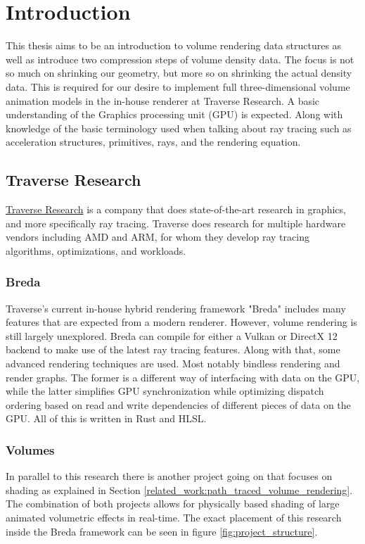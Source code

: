 \section{Introduction} \label{introduction}
This thesis aims to be an introduction to volume rendering data structures as well as introduce two compression steps of volume density data. The focus is not so much on shrinking our geometry, but more so on shrinking the actual density data. This is required for our desire to implement full three-dimensional volume animation models in the in-house renderer at Traverse Research. A basic understanding of the Graphics processing unit (GPU) is expected. Along with knowledge of the basic terminology used when talking about ray tracing such as acceleration structures, primitives, rays, and the rendering equation.


\subsection{Traverse Research} \label{introduction:traverse_research}
\href{https://traverseresearch.nl/}{Traverse Research} is a company that does state-of-the-art research in graphics, and more specifically ray tracing. Traverse does research for multiple hardware vendors including AMD and ARM, for whom they develop ray tracing algorithms, optimizations, and workloads.
\subsubsection{Breda} \label{introduction:traverse_research:breda}
Traverse's current in-house hybrid rendering framework "Breda" includes many features that are expected from a modern renderer. However, volume rendering is still largely unexplored. Breda can compile for either a Vulkan or DirectX 12 backend to make use of the latest ray tracing features. Along with that, some advanced rendering techniques are used. Most notably bindless rendering\cite{BindlessRenderingSetup} and render graphs\cite{RenderGraph101}. The former is a different way of interfacing with data on the GPU, while the latter simplifies GPU synchronization while optimizing dispatch ordering based on read and write dependencies of different pieces of data on the GPU. All of this is written in Rust and HLSL.
\subsubsection{Volumes} \label{introduction:traverse_research:volumes}
In parallel to this research there is another project going on that focuses on shading as explained in Section \ref{related_work:path_traced_volume_rendering}. The combination of both projects allows for physically based shading of large animated volumetric effects in real-time. The exact placement of this research inside the Breda framework can be seen in figure \ref{fig:project_structure}.

